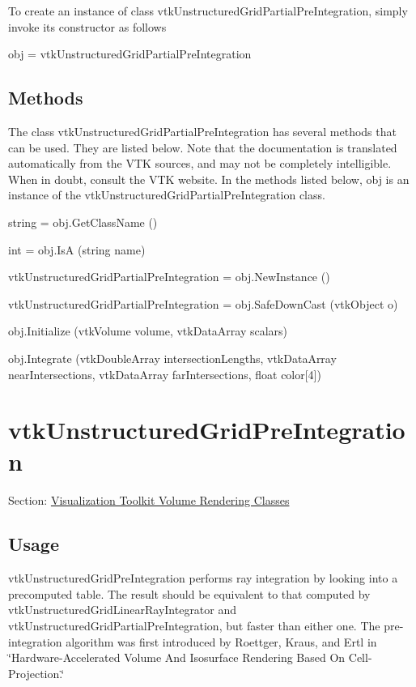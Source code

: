 To create an instance of class vtk\-Unstructured\-Grid\-Partial\-Pre\-Integration, simply invoke its constructor as follows \begin{DoxyVerb}  obj = vtkUnstructuredGridPartialPreIntegration
\end{DoxyVerb}
 \hypertarget{vtkwidgets_vtkxyplotwidget_Methods}{}\subsection{Methods}\label{vtkwidgets_vtkxyplotwidget_Methods}
The class vtk\-Unstructured\-Grid\-Partial\-Pre\-Integration has several methods that can be used. They are listed below. Note that the documentation is translated automatically from the V\-T\-K sources, and may not be completely intelligible. When in doubt, consult the V\-T\-K website. In the methods listed below, {\ttfamily obj} is an instance of the vtk\-Unstructured\-Grid\-Partial\-Pre\-Integration class. 
\begin{DoxyItemize}
\item {\ttfamily string = obj.\-Get\-Class\-Name ()}  
\item {\ttfamily int = obj.\-Is\-A (string name)}  
\item {\ttfamily vtk\-Unstructured\-Grid\-Partial\-Pre\-Integration = obj.\-New\-Instance ()}  
\item {\ttfamily vtk\-Unstructured\-Grid\-Partial\-Pre\-Integration = obj.\-Safe\-Down\-Cast (vtk\-Object o)}  
\item {\ttfamily obj.\-Initialize (vtk\-Volume volume, vtk\-Data\-Array scalars)}  
\item {\ttfamily obj.\-Integrate (vtk\-Double\-Array intersection\-Lengths, vtk\-Data\-Array near\-Intersections, vtk\-Data\-Array far\-Intersections, float color\mbox{[}4\mbox{]})}  
\end{DoxyItemize}\hypertarget{vtkvolumerendering_vtkunstructuredgridpreintegration}{}\section{vtk\-Unstructured\-Grid\-Pre\-Integration}\label{vtkvolumerendering_vtkunstructuredgridpreintegration}
Section\-: \hyperlink{sec_vtkvolumerendering}{Visualization Toolkit Volume Rendering Classes} \hypertarget{vtkwidgets_vtkxyplotwidget_Usage}{}\subsection{Usage}\label{vtkwidgets_vtkxyplotwidget_Usage}
vtk\-Unstructured\-Grid\-Pre\-Integration performs ray integration by looking into a precomputed table. The result should be equivalent to that computed by vtk\-Unstructured\-Grid\-Linear\-Ray\-Integrator and vtk\-Unstructured\-Grid\-Partial\-Pre\-Integration, but faster than either one. The pre-\/integration algorithm was first introduced by Roettger, Kraus, and Ertl in \char`\"{}\-Hardware-\/\-Accelerated Volume And Isosurface Rendering Based
 On Cell-\/\-Projection.\char`\"{}

